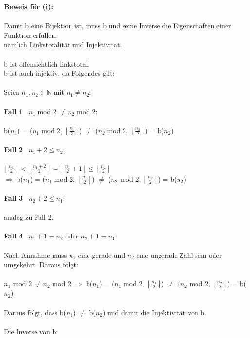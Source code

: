 \documentclass[a4paper,10pt]{article}
\newcommand{\rf}{\right\rfloor}
\newcommand{\lf}{\left\lfloor}
\newcommand{\N}{\mathbb{N}}
\begin{document}
\textbf{Beweis für (i):} \\
\\
Damit b eine Bijektion ist, muss b und seine Inverse die Eigenschaften einer Funktion erfüllen, \\
nämlich Linkstotalität und Injektivität. \\
\\
b ist offensichtlich linkstotal.\\
b ist auch injektiv, da Folgendes gilt: \\
\\
Seien $n_1,n_2 \in \N$ mit $n_1 \neq n_2$: \\
\\
\textbf{Fall 1}~ $n_1$ mod 2 $\neq n_2$ mod 2: \\
\\
b($n_1$) = ($n_1$ mod 2, $\lf \frac{n_1}{2} \rf$) $\neq$ ($n_2$ mod 2, $\lf \frac{n_2}{2} \rf$) = b($n_2$)\\
\\
\textbf{Fall 2}~ $n_1 + 2 \leq n_2$: \\
\\
$\lf \frac{n_1}{2} \rf < \lf \frac{n_1 + 2}{2} \rf = \lf \frac{n_1}{2} + 1 \rf \leq \lf \frac{n_2}{2} \rf$ \\  
$\Rightarrow$ b($n_1$) = ($n_1$ mod 2, $\lf \frac{n_1}{2} \rf$) $\neq$ ($n_2$ mod 2, $\lf \frac{n_2}{2} \rf$) = b($n_2$) \\
\\
\textbf{Fall 3}~ $n_2 + 2 \leq n_1$: \\
\\
analog zu Fall 2. \\
\\
\textbf{Fall 4}~ $n_1 + 1 = n_2$ oder $n_2 + 1 = n_1$: \\
\\
Nach Annahme muss $n_1$ eine gerade und $n_2$ eine ungerade Zahl sein oder \\
umgekehrt. Daraus folgt:\\
\\
$n_1$ mod 2 $\neq n_2$ mod 2 $\Rightarrow$ 
b($n_1$) = ($n_1$ mod 2, $\lf \frac{n_1}{2} \rf$) $\neq$ ($n_2$ mod 2, $\lf \frac{n_2}{2} \rf$) = b($n_2$)\\
\\
Daraus folgt, dass b($n_1$) $\neq$ b($n_2$) und damit die Injektivität von b.
\\
\\
Die Inverse von b: \\
\\
\end{document}
